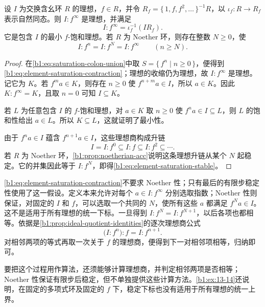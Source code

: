 \begin{proposition}\label{b1:prop:element-saturation}
	设 \(I\) 为交换含幺环 \(R\) 的理想，\(f\in R\)，并令 \(R_f=\{\,1,f,f^2,\ldots\,\}^{-1}R\)，以 \(\iota_f:R\rightarrow R_f\) 表示自然同态。则 \(I:f^\infty\) 是理想，并满足
	\begin{equation}\label{b1:eq:element-saturation-contraction}
		I:f^\infty=\iota_f^{-1}(IR_f).
	\end{equation}
	它是包含 \(I\) 的最小 \(f\)-饱和理想。若 \(R\) 为 Noether 环，则存在整数 \(N\geq0\)，使
	\begin{equation}\label{b1:eq:element-saturation-stable}
		I:f^n=I:f^N=I:f^\infty\qquad(n\geq N).
	\end{equation}
\end{proposition}
\begin{proof}
	在\eqref{b1:eq:saturation-colon-union}中取 \(S=\{\,f^n\mid n\geq0\,\}\)，便得到\eqref{b1:eq:element-saturation-contraction}；理想的收缩仍为理想，故 \(I:f^\infty\) 是理想。记它为 \(K\)。若 \(f^ma\in K\)，则存在 \(n\geq0\) 使 \(f^{n+m}a\in I\)，所以 \(a\in K\)。因此 \(K:f^\infty=K\)，且取 \(n=0\) 可知 \(I\subseteq K\)。

	若 \(L\) 为任意包含 \(I\) 的 \(f\)-饱和理想，对 \(a\in K\) 取 \(n\geq0\) 使 \(f^na\in I\subseteq L\)，则 \(L\) 的饱和性给出 \(a\in L\)。所以 \(K\subseteq L\)，这就证明了最小性。

	由于 \(f^na\in I\) 蕴含 \(f^{n+1}a\in I\)，这些理想商构成升链
	\[
		I=I:f^0\subseteq I:f\subseteq I:f^2\subseteq\cdots.
	\]
	若 \(R\) 为 Noether 环，\cref{b1:prop:noetherian-acc}说明这条理想升链从某个 \(N\) 起稳定。它的并集因此等于 \(I:f^N\)，即得\eqref{b1:eq:element-saturation-stable}。
\end{proof}

\begin{samepage}
	\eqref{b1:eq:element-saturation-contraction}不要求 Noether 性；只有最后的有限步稳定性使用了这一假设。定义本来允许对每个 \(a\in I:f^\infty\) 分别选取指数；Noether 性则保证，对固定的 \(I\) 和 \(f\)，可以选取一个共同的 \(N\)，使所有这些 \(a\) 都满足 \(f^Na\in I\)。这不是适用于所有理想的统一下标。一旦得到 \(I:f^N=I:f^{N+1}\)，以后各项也都相等。依据是\cref{b1:prop:ideal-quotient-identities}的逐次理想商公式
	\[
		\bigl(I:f^n\bigr):f=I:f^{n+1}.
	\]
	对相邻两项的等式再取一次关于 \(f\) 的理想商，便得到下一对相邻项相等，归纳即可。
\end{samepage}

要把这个过程用作算法，还须能够计算理想商，并判定相邻两项是否相等；Noether 性保证有限步后稳定，但不单独提供这些计算方法。\cref{b1:ex:13-14}还说明，在固定的多项式环及固定的 \(f\) 下，稳定下标也没有适用于所有理想的统一上界。

